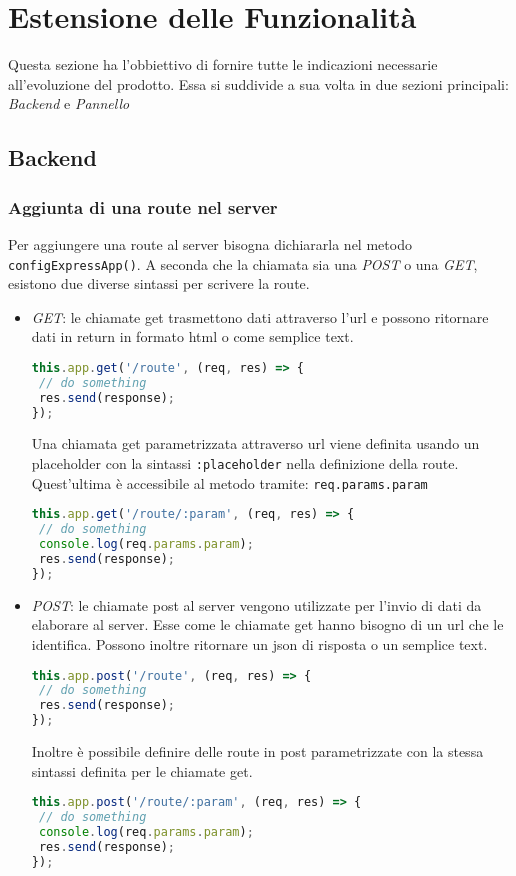 \section{Estensione delle Funzionalità}\label{Estensione}
Questa sezione ha l'obbiettivo di fornire tutte le indicazioni necessarie all'evoluzione del prodotto. 
Essa si suddivide a sua volta in due sezioni principali: \textit{Backend} e \textit{Pannello}

\subsection{Backend}\label{Estensione_Server}
\subsubsection{Aggiunta di una route nel server}\label{ExtAddRoute}
Per aggiungere una route al server bisogna dichiararla nel metodo \texttt{configExpressApp()}. 
A seconda che la chiamata sia una \textit{POST} o una \textit{GET}, esistono due diverse sintassi per scrivere la route.
\begin{itemize}
 \item \textit{GET}: le chiamate get trasmettono dati attraverso l'url e possono ritornare dati in return in formato html o come semplice text.
\begin{lstlisting}[language=JavaScript]
this.app.get('/route', (req, res) => {
 // do something
 res.send(response);
});
\end{lstlisting} 
Una chiamata get parametrizzata attraverso url viene definita usando un placeholder con la sintassi \texttt{:placeholder} nella definizione della route. Quest'ultima è accessibile al metodo tramite: \texttt{req.params.param}
\begin{lstlisting}[language=JavaScript]
this.app.get('/route/:param', (req, res) => {
 // do something
 console.log(req.params.param);
 res.send(response);
});
\end{lstlisting}
\item \textit{POST}: le chiamate post al server vengono utilizzate per l'invio di dati da elaborare al server. Esse come le chiamate get hanno bisogno di un url che le identifica. Possono inoltre ritornare un json di risposta o un semplice text. 
\begin{lstlisting}[language=JavaScript]
this.app.post('/route', (req, res) => {
 // do something
 res.send(response);
});
\end{lstlisting} 
Inoltre è possibile definire delle route in post parametrizzate con la stessa sintassi definita per le chiamate get. 
\begin{lstlisting}[language=JavaScript]
this.app.post('/route/:param', (req, res) => {
 // do something
 console.log(req.params.param);
 res.send(response);
});
\end{lstlisting}
\end{itemize}

